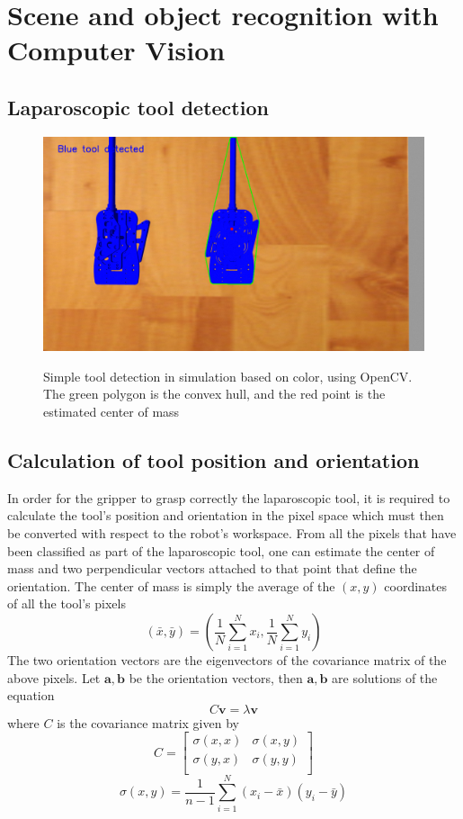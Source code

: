 \section{Scene and object recognition with Computer Vision}

\subsection{Laparoscopic tool detection}

\begin{center}
\begin{figure}[H]
\centering
\includegraphics[width=12cm]{images/opencv-tool-convex-hull.png}\\
\caption{Simple tool detection in simulation based on color, using OpenCV. The green polygon is the convex hull, and the red point is the
estimated center of mass}
\end{figure}
\end{center}

\subsection{Calculation of tool position and orientation}

In order for the gripper to grasp correctly the laparoscopic tool, it is required to calculate the tool's position and orientation in the pixel space 
which must then be converted with respect to the robot's workspace. From all the pixels that have been classified as part of the laparoscopic tool, 
one can estimate the center of mass and two perpendicular vectors 
attached to that point that define the orientation. The center of mass is simply the average of the $(x,y)$ coordinates of all the tool's pixels
\[
\left( \bar{x}, \bar{y} \right) = \left( \frac{1}{N}\sum_{i=1}^{N} x_i , \frac{1}{N}\sum_{i=1}^{N} y_i \right)
\]
The two orientation vectors are the eigenvectors of the covariance matrix of the above pixels. Let $\mathbf{a},\mathbf{b}$ be the orientation vectors, 
then $\mathbf{a},\mathbf{b}$ are solutions of the equation
\[
C \mathbf{v} = λ \mathbf{v}
\]
where $C$ is the covariance matrix given by
\[
C = \begin{bmatrix}
σ(x,x) & σ(x,y) \\
σ(y,x) & σ(y,y) \\
\end{bmatrix}
\]
\[
σ(x,y) = \frac{1}{n-1} \sum_{i=1}^{N} ( x_i - \bar{x} )( y_i - \bar{y} )
\]

